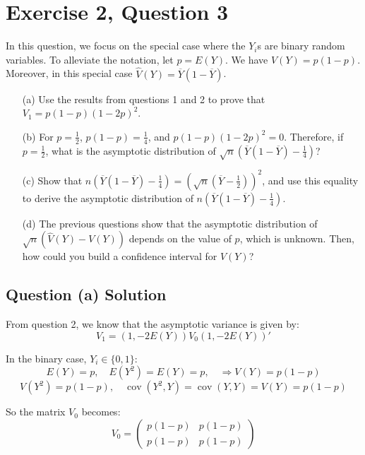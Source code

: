 \documentclass{article}
\begin{document}
\section{Exercise 2, Question 3} In this question, we focus on the special case where the $Y_i$s are binary random variables. To alleviate the notation, let $p = E(Y)$. We have $V(Y) = p(1 - p)$. Moreover, in this special case $\widehat{V}(Y) = \overline{Y}(1 - \overline{Y})$.

\begin{enumerate}
    \item[(a)] Use the results from questions 1 and 2 to prove that $V_1 = p(1 - p)(1 - 2p)^2$.

    \item[(b)] For $p = \frac{1}{2}$, $p(1 - p) = \frac{1}{4}$, and $p(1 - p)(1 - 2p)^2 = 0$. Therefore, if $p = \frac{1}{2}$, what is the asymptotic distribution of $\sqrt{n} \left( \overline{Y}(1 - \overline{Y}) - \frac{1}{4} \right)$?

    \item[(c)] Show that $n\left( \overline{Y}(1 - \overline{Y}) - \frac{1}{4} \right) = \left( \sqrt{n} \left( \overline{Y} - \frac{1}{2} \right) \right)^2$, and use this equality to derive the asymptotic distribution of $n\left( \overline{Y}(1 - \overline{Y}) - \frac{1}{4} \right)$.

    \item[(d)] The previous questions show that the asymptotic distribution of $\sqrt{n} \left( \widehat{V}(Y) - V(Y) \right)$ depends on the value of $p$, which is unknown. Then, how could you build a confidence interval for $V(Y)$?
\end{enumerate}

\subsection{Question (a) Solution}
From question 2, we know that the asymptotic variance is given by:
\[
V_1 = (1, -2E(Y)) V_0 (1, -2E(Y))'
\]

In the binary case, $Y_i \in \{0, 1\}$:
\[
E(Y) = p, \quad E(Y^2) = E(Y) = p, \quad \Rightarrow V(Y) = p(1 - p)
\]
\[
V(Y^2) = p(1 - p), \quad \operatorname{cov}(Y^2, Y) = \operatorname{cov}(Y, Y) = V(Y) = p(1 - p)
\]

So the matrix $V_0$ becomes:
\[
V_0 = 
\begin{pmatrix}
p(1 - p) & p(1 - p) \\
p(1 - p) & p(1 - p)
\end{pmatrix}
\]
\end{document}
